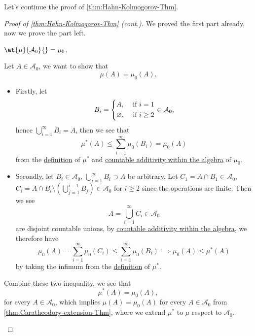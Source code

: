 Let's continue the proof of \autoref{thm:Hahn-Kolmogorov-Thm}.
\begin{proof}[Proof of \autoref{thm:Hahn-Kolmogorov-Thm} (cont.)]\label{pf:Hahn-Kolmogorov-Thm-cont}
	We proved the first part already, now we prove the part left.
	\begin{claim}
		\(\at{\mu }{\mathcal{A} _0}{} = \mu _0\).
	\end{claim}
	\begin{explanation}
		Let \(A\in \mathcal{A} _0\), we want to show that
		\[
			\mu (A) = \mu_0(A).
		\]
		\begin{itemize}
			\item Firstly, let
			      \[
				      B_{i} = \begin{dcases}
					      A,            & \text{ if } i= 1    \\
					      \varnothing , & \text{ if } i\geq 2
				      \end{dcases}\in \mathcal{A} _0,
			      \]
			      hence \(\bigcup\limits_{i=1}^{\infty} B_{i} = A\), then we see that
			      \[
				      \mu ^{\ast} (A)\leq \sum\limits_{i=1}^{\infty} \mu _0(B_{i}) = \mu _0(A)
			      \]
			      from the \hyperref[prop:outer-measure]{definition} of \(\mu ^{\ast} \) and \hyperref[def:pre-measure-countable-additivity-within-the-algebra]{countable additivity within the algebra}
			      of \(\mu _0\).
			\item Secondly, let \(B_{i}\in \mathcal{A} _0\), \(\bigcup\limits_{i=1}^{\infty} B_{i}\supset A\) be arbitrary.
			      Let \(C_1 = A\cap B_1\in \mathcal{A} _0\), \(C_{i} = A\cap B_{i}\setminus \left(\bigcup\limits_{j=1}^{i-1} B_{j}\right)\in \mathcal{A} _0\) for \(i\geq 2\)
			      since the operations are finite. Then we see
			      \[
				      A = \bigcup\limits_{i=1}^{\infty} C_{i}\in \mathcal{A} _0
			      \]
			      are disjoint countable unions, by \hyperref[def:pre-measure-countable-additivity-within-the-algebra]{countable additivity within the algebra},
			      we therefore have
			      \[
				      \mu _0(A) = \sum\limits_{i=1}^{\infty} \mu _0(C_{i}) \leq \sum\limits_{i=1}^{\infty} \mu_0 (B_{i})\implies \mu _0(A)\leq \mu ^{\ast} (A)
			      \]
			      by taking the infimum from the \hyperref[prop:outer-measure]{definition} of \(\mu ^{\ast} \).
		\end{itemize}
		Combine these two inequality, we see that
		\[
			\mu ^{\ast} (A) = \mu _0(A),
		\]
		for every \(A\in\mathcal{A} _0\), which implies \(\mu (A) = \mu _0(A)\) for every \(A\in \mathcal{A}_0\) from \autoref{thm:Caratheodory-extension-Thm},
		where we extend \(\mu ^{\ast} \) to \(\mu \) respect to \(\mathcal{A}_0\).
	\end{explanation}
\end{proof}

